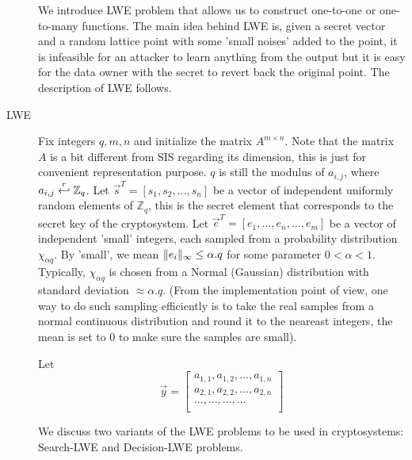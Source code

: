 \begin{description}
            We introduce LWE problem \cite{regev2005lattices} that allows us to construct
            one-to-one or
            one-to-many functions. The main idea behind LWE is, given a
            secret vector and a random lattice point with some 'small noises' added to
            the point, it is infeasible for an attacker to learn anything from
            the output but it is easy for the data owner with the secret to
            revert back the original point. The description of LWE follows.
        \item [LWE] Fix integers $q, m, n$ and initialize the matrix
            $A^{m \times n}$. Note that the matrix
            $A$ is a bit different from SIS regarding its dimension,
            this is just for convenient representation purpose.
            $q$ is still the
            modulus of $a_{i,j}$, where $a_{i,j} \stackrel{r}{\hookleftarrow}
            \mathbb{Z}_q$. Let $\vec{s}^T = \left[ s_1,s_2,\dots,s_n
            \right]$ be a vector of independent uniformly random
            elements of $\mathbb{Z}_q$, this is the secret element that
            corresponds to the secret key of the cryptosystem. Let
            $\vec{e}^T = [e_1,\dots,e_n,\dots,e_m]$ be a vector of
            independent 'small' integers, each sampled from a
            probability distribution $\chi_{\alpha q}$. By 'small', we
            mean $\Vert e_i \Vert_{\infty} \leq \alpha . q$ for some parameter
            $0 < \alpha < 1$. Typically, $\chi_{\alpha q}$ is chosen from a
            Normal (Gaussian) distribution with standard deviation
            $\approx \alpha . q$. (From the implementation point of view,
            one way to do such sampling efficiently is to take
            the real samples from a normal continuous distribution and round it
            to the neareast integers, the mean is set to 0 to make sure the
            samples are small).

            Let
            \[
                \vec{y} = \begin{bmatrix}
                    a_{1,1}, a_{1,2},\dots, a_{1,n}\\
                    a_{2,1}, a_{2,2},\dots, a_{2,n}\\
                    \dots,\dots, \dots,\dots\\

                \end{bmatrix}
            \]

            We discuss two
            variants of the LWE problems to be used in cryptosystems: Search-LWE
            and Decision-LWE problems.


\end{description}
